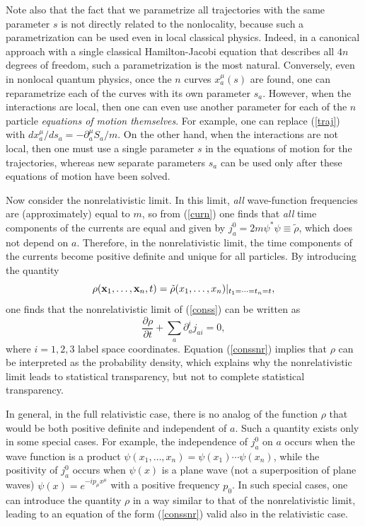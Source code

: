 \documentclass[12pt]{article}
\begin{document}
Note also that the fact
that we parametrize all trajectories with the same parameter $s$ 
is not directly related to the nonlocality, because such a parametrization 
can be used even in local classical physics. Indeed, in a canonical approach 
with a single classical Hamilton-Jacobi equation 
that describes all $4n$ degrees 
of freedom, such a parametrization is the most natural. 
Conversely, 
even in nonlocal quantum physics, once the 
$n$ curves $x^{\mu}_a(s)$ are found, one can reparametrize each 
of the curves with its own parameter $s_a$. However, when the interactions 
are local, then one can even use another parameter for each of the 
$n$ particle {\em equations of motion themselves}. 
For example, one can replace (\ref{traj}) with 
$dx_a^{\mu}/ds_a = -\partial_a^{\mu}S_a/m$. On the other hand, 
when the interactions 
are not local, then one must use a single parameter $s$ in the 
equations of motion for the trajectories, whereas new separate parameters 
$s_a$ can be used only after these equations of motion have been solved.

Now consider the nonrelativistic limit. In this limit, {\em all}  
wave-function frequencies are (approximately) equal to $m$, so 
from (\ref{curn}) one finds that {\em all}
time components of the currents are equal and given by 
$j^0_a=2m\psi^*\psi\equiv\tilde{\rho}$, which does not depend on $a$. 
Therefore, 
in the nonrelativistic limit, the time components of the currents 
become positive definite and unique for all particles. 
By introducing the quantity
\begin{equation}
\rho({\bf x}_1,\ldots ,{\bf x}_n,t)=
\tilde{\rho}(x_1,\ldots ,x_n)|_{t_1=\cdots =t_n=t}, 
\end{equation}
one finds that the nonrelativistic limit of (\ref{conss}) can be written 
as    
\begin{equation}\label{conssnr}
\frac{\partial\rho}{\partial t}+  \sum_a\partial^{i}_a j_{ai}=0,
\end{equation}   
where $i=1,2,3$ label space coordinates. Equation (\ref{conssnr}) 
implies that $\rho$ can be interpreted as the probability density, 
which explains why the nonrelativistic limit leads to  
statistical transparency, but not to complete statistical 
transparency. 

In general, 
in the full relativistic case, there is no analog of the function 
$\rho$ that would be both positive definite and independent of $a$. 
Such a quantity exists only in some special cases.
For example, the independence of 
$j^0_a$ on $a$ occurs when the wave function is a product 
$\psi(x_1,\ldots ,x_n)=\psi(x_1)\cdots\psi(x_n)$, while the 
positivity of $j^0_a$ occurs when $\psi(x)$ is a plane wave 
(not a superposition of plane waves) $\psi(x)=e^{-ip_{\mu}x^{\mu}}$
with a positive frequency $p_0$. 
%
%
In such special cases, 
one can introduce the quantity $\rho$ in a way similar to that 
of the nonrelativistic limit, leading to an equation 
of the form (\ref{conssnr}) valid also in the relativistic 
case.
\end{document}
